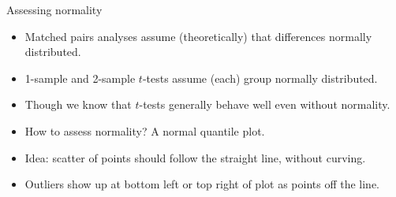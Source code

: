 \documentclass[unknownkeysallowed]{beamer}\usepackage[]{graphicx}\usepackage[]{color}
\makeatletter
\def\maxwidth{ %
  \ifdim\Gin@nat@width>\linewidth
    \linewidth
  \else
    \Gin@nat@width
  \fi
}
\newcommand{\hlopt}[1]{\textcolor[rgb]{0,0,0}{#1}}%
\newcommand{\hlstd}[1]{\textcolor[rgb]{0.345,0.345,0.345}{#1}}%
\newcommand{\hlkwd}[1]{\textcolor[rgb]{0.737,0.353,0.396}{\textbf{#1}}}%
\newenvironment{kframe}{%
 \def\at@end@of@kframe{}%
 \ifinner\ifhmode%
  \def\at@end@of@kframe{\end{minipage}}%
  \begin{minipage}{\columnwidth}%
 \fi\fi%
 \def\FrameCommand##1{\hskip\@totalleftmargin \hskip-\fboxsep
 \colorbox{shadecolor}{##1}\hskip-\fboxsep
     \hskip-\linewidth \hskip-\@totalleftmargin \hskip\columnwidth}%
 \MakeFramed {\advance\hsize-\width
   \@totalleftmargin\z@ \linewidth\hsize
   \@setminipage}}%
 {\par\unskip\endMakeFramed%
 \at@end@of@kframe}
\newenvironment{knitrout}{}{} %
\makeatother
\begin{document}
\begin{frame}[fragile]{Assessing normality}

  \begin{itemize}
  \item Matched pairs analyses assume (theoretically) that differences normally
distributed. 
\item 1-sample and 2-sample $t$-tests assume (each) group normally distributed.
\item Though we know that $t$-tests generally behave well even
without normality. 
\item How to assess normality? A normal quantile plot.
\item Idea: scatter of points should follow the straight line, without curving.
\item Outliers show up at bottom left or top right of plot as points
  off the line.
  \end{itemize}


  
\end{frame}

\end{document}
